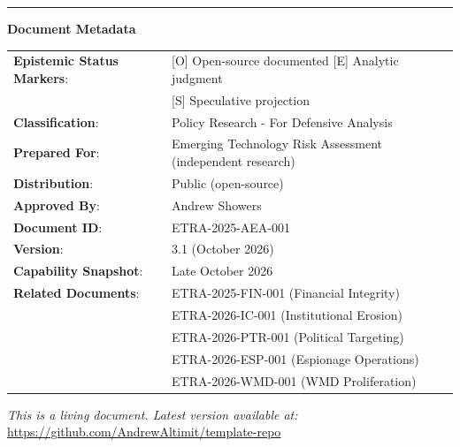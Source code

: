 \documentclass[11pt,letterpaper]{article}
\begin{document}
\clearpage
\begin{center}
\rule{0.6\textwidth}{0.5pt}
\end{center}

\vspace{0.3cm}

\begin{center}
\small\textbf{Document Metadata}

\vspace{0.5em}

\begin{tabular}{ll}
\textbf{Epistemic Status Markers}: & [O] Open-source documented \textbar{} [E] Analytic judgment \\
& [S] Speculative projection \\
\textbf{Classification}: & Policy Research - For Defensive Analysis \\
\textbf{Prepared For}: & Emerging Technology Risk Assessment (independent research) \\
\textbf{Distribution}: & Public (open-source) \\
\textbf{Approved By}: & Andrew Showers \\
\textbf{Document ID}: & ETRA-2025-AEA-001 \\
\textbf{Version}: & 3.1 (October 2026) \\
\textbf{Capability Snapshot}: & Late October 2026 \\
\textbf{Related Documents}: & ETRA-2025-FIN-001 (Financial Integrity) \\
& ETRA-2026-IC-001 (Institutional Erosion) \\
& ETRA-2026-PTR-001 (Political Targeting) \\
& ETRA-2026-ESP-001 (Espionage Operations) \\
& ETRA-2026-WMD-001 (WMD Proliferation) \\
\end{tabular}
\end{center}

\vspace{0.3cm}

\begin{center}
\small
\textit{This is a living document. Latest version available at:}\\[0.3em]
\url{https://github.com/AndrewAltimit/template-repo}
\end{center}
\end{document}
